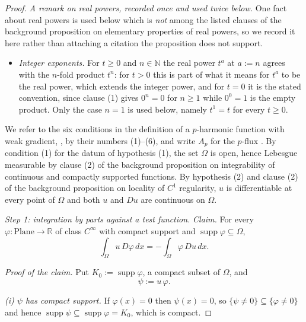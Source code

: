 \begin{proof}
\medskip\noindent\emph{A remark on real powers, recorded once and used twice below.}  One fact
about real powers is used below which is \emph{not} among the listed clauses of the background
proposition on elementary properties of real powers, so we record it here rather than attaching a
citation the proposition does not support.
\begin{itemize}
\item[(P1)] \emph{Integer exponents.}  For $t\ge0$ and $n\in\mathbb{N}$ the real power $t^{a}$
at $a:=n$ agrees with the $n$-fold product $t^{n}$: for $t>0$ this is part of what it means for
$t^{a}$ to be the real power, which extends the integer power, and for $t=0$ it is the stated
convention, since clause (1) gives $0^{n}=0$ for $n\ge1$ while $0^{0}=1$ is the empty product.
Only the case $n=1$ is used below, namely $t^{1}=t$ for every $t\ge0$.
\end{itemize}

We refer to the six conditions in the definition of a $p$-harmonic function with weak gradient,
, by their numbers (1)--(6), and write $A_p$ for the $p$-flux .
By condition (1) for the datum of hypothesis (1), the set $\Omega$ is open, hence Lebesgue
measurable by clause (2) of the background proposition on integrability of continuous and
compactly supported functions.  By hypothesis (2) and clause (2) of the background proposition
on locality of $C^{1}$ regularity, $u$ is differentiable at every point of $\Omega$ and both
$u$ and $Du$ are continuous on $\Omega$.

\medskip\noindent\emph{Step 1: integration by parts against a test function.}
\emph{Claim.}  For every $\varphi\colon\mathrm{Plane}\to\mathbb{R}$ of class $C^\infty$ with
compact support and $\operatorname{supp}\varphi\subseteq\Omega$,
\begin{equation}\label{eq:pwgc-ibp}
  \int_\Omega u\,D\varphi\,dx=-\int_\Omega \varphi\,Du\,dx .
\end{equation}

\emph{Proof of the claim.}  Put $K_0:=\operatorname{supp}\varphi$, a compact subset of
$\Omega$, and
\[
  \psi:=u\,\varphi .
\]

\emph{(i) $\psi$ has compact support.}  If $\varphi(x)=0$ then $\psi(x)=0$, so
$\{\psi\neq0\}\subseteq\{\varphi\neq0\}$ and hence
$\operatorname{supp}\psi\subseteq\operatorname{supp}\varphi=K_0$, which is compact.


\end{proof}

